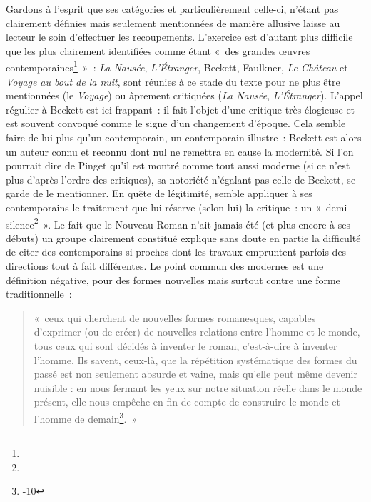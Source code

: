 \documentclass[12pt, a4paper]{article}
\begin{document}
Gardons à l'esprit que ses catégories et particulièrement celle-ci, n'étant pas clairement définies mais seulement mentionnées de manière allusive laisse au lecteur le soin d'effectuer les recoupements. L'exercice est d'autant plus difficile que les plus clairement identifiées comme étant «~des grandes œuvres contemporaines\footnote{}~»~: \textit{La Nausée}, \textit{L'Étranger}, Beckett, Faulkner, \textit{Le Château} et \textit{Voyage au bout de la nuit}, sont réunies à ce stade du texte pour ne plus être mentionnées (le \textit{Voyage}) ou âprement critiquées (\textit{La Nausée}, \textit{L'Étranger}). L'appel régulier à Beckett est ici frappant~: il fait l'objet d'une critique très élogieuse et est souvent convoqué comme le signe d'un changement d'époque. Cela semble faire de lui plus qu'un contemporain, un contemporain illustre~: Beckett est alors un auteur connu et reconnu dont nul ne remettra en cause la modernité. Si l'on pourrait dire de Pinget qu'il est montré comme tout aussi moderne (si ce n'est plus d'après l'ordre des critiques), sa notoriété n'égalant pas celle de Beckett, \robbe{} se garde de le mentionner. En quête de légitimité, \robbe{} semble appliquer à ses contemporains le traitement que lui réserve (selon lui) la critique~: un «~demi-silence\footnote{}~». Le fait que le Nouveau Roman n'ait jamais été (et plus encore à ses débuts) un groupe clairement constitué explique sans doute en partie la difficulté de citer des contemporains si proches dont les travaux empruntent parfois des directions tout à fait différentes. Le point commun des modernes est une définition négative, pour des formes nouvelles mais surtout contre une forme traditionnelle~:
\begin{quote}
«~ceux qui cherchent de nouvelles formes romanesques, capables d’exprimer (ou de créer) de nouvelles relations entre l’homme et le monde, tous ceux qui sont décidés à inventer le roman, c’est-à-dire à inventer l’homme. Ils savent, ceux-là, que la répétition systématique des formes du passé est non seulement absurde et vaine, mais qu’elle peut même devenir nuisible : en nous fermant les yeux sur notre situation réelle dans le monde présent, elle nous empêche en fin de compte de construire le monde et l’homme de demain\footnote{-10}.~»    
\end{quote}
\end{document}
